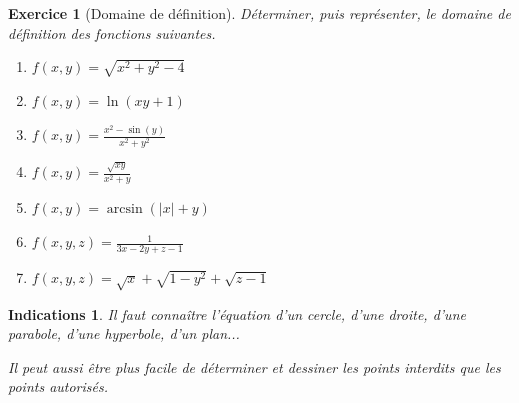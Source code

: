 \documentclass[11pt,a4paper]{article}
\theoremstyle{exostyle}
\newtheorem{exo}{Exercice}
\newtheorem{ind}{Indications}
\newcommand{\exercice}[1]{} \newcommand{\finexercice}{}
\newcommand{\enonce}{\begin{exo}} \newcommand{\finenonce}{\end{exo}}
\newcommand{\indication}{\begin{ind}} \newcommand{\finindication}{\end{ind}}
\begin{document}
\finexercice
	
	
\exercice{}
\enonce[Domaine de définition]
Déterminer, puis représenter, le domaine de définition des fonctions suivantes.
\begin{enumerate}
	\item $f(x,y) = \sqrt{x^2 + y^2 - 4}$
	\item $f(x,y) = \ln(xy+1)$
	\item $f(x,y) = \frac{x^2 - \sin(y)}{x^2+y^2}$
	\item $f(x,y) = \frac{\sqrt{xy}}{x^2+y}$
	\item $f(x,y) = \arcsin(|x| + y)$		
	\item $f(x,y,z) = \frac{1}{3x-2y+z-1}$	
	\item $f(x,y,z) = \sqrt{x} + \sqrt{1-y^2} + \sqrt{z-1}$	
\end{enumerate}
\finenonce

\indication
Il faut connaître l'équation d'un cercle, d'une droite, d'une parabole, d'une hyperbole, d'un plan...

Il peut aussi être plus facile de déterminer et dessiner les points interdits que les points autorisés.
\finindication
\end{document}
